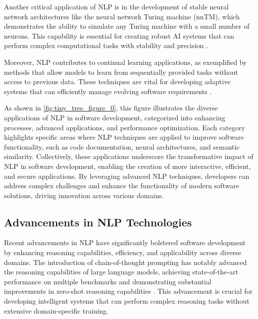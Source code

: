 Another critical application of NLP is in the development of stable neural network architectures like the neural network Turing machine (nnTM), which demonstrates the ability to simulate any Turing machine with a small number of neurons. This capability is essential for creating robust AI systems that can perform complex computational tasks with stability and precision \cite{stogin2022provablystableneuralnetwork}. 

Moreover, NLP contributes to continual learning applications, as exemplified by methods that allow models to learn from sequentially provided tasks without access to previous data. These techniques are vital for developing adaptive systems that can efficiently manage evolving software requirements \cite{chitale2023taskarithmeticloracontinual}.

As shown in \autoref{fig:tiny_tree_figure_0}, this figure illustrates the diverse applications of NLP in software development, categorized into enhancing processes, advanced applications, and performance optimization. Each category highlights specific areas where NLP techniques are applied to improve software functionality, such as code documentation, neural architectures, and semantic similarity. Collectively, these applications underscore the transformative impact of NLP in software development, enabling the creation of more interactive, efficient, and secure applications. By leveraging advanced NLP techniques, developers can address complex challenges and enhance the functionality of modern software solutions, driving innovation across various domains.


\subsection{Advancements in NLP Technologies} \label{subsec:Advancements in NLP Technologies}



Recent advancements in NLP have significantly bolstered software development by enhancing reasoning capabilities, efficiency, and applicability across diverse domains. The introduction of chain-of-thought prompting has notably advanced the reasoning capabilities of large language models, achieving state-of-the-art performance on multiple benchmarks and demonstrating substantial improvements in zero-shot reasoning capabilities . This advancement is crucial for developing intelligent systems that can perform complex reasoning tasks without extensive domain-specific training.



